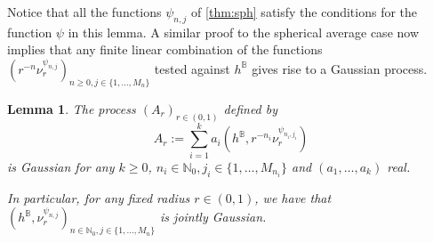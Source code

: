 \documentclass[JEP,XML,SOM,Unicode,published]{cedram}
\newtheorem{lemma}[theorem]{Lemma}
\theoremstyle{definition}
\newcommand{\N}{\mathbb{N}}
\newcommand{\B}{\mathbb{B}}\let\D\B\let\Ub\B
\begin{document}
Notice that all the functions $\psi_{n,j}$ of \cref{thm:sph} satisfy the conditions for the function $\psi$ in this lemma. A similar proof to the spherical average case now implies that any finite linear combination of the functions $(r^{-n}\nu^{\psi_{n,j}}_r)_{n \geq 0, j \in \{1, \dots, M_n\}}$ tested against $h^\B$ gives rise to a Gaussian process.

\begin{lemma}\label{lem:gp} The process $(A_r)_{r\in (0,1)}$ defined by\vspace*{-3pt}\enlargethispage{.2\baselineskip}%
\begin{equation}\label{eq:gp}
A_r := \sum_{i=1}^k a_i (h^\D,r^{-n_i}\nu^{\psi_{n_i,j_i}}_r)
\end{equation} is Gaussian for any $k\ge 0$, $n_i\in \N_0,j_i \in \{1, \dots, M_{n_i}\}$ and $(a_1,\dots, a_k)$ real.

In particular, for any fixed radius $r \in (0,1)$, we have that $(h^\B, \nu^{\psi_{n,j}}_r)_{n \in \N_0, j \in \{1, \dots, M_n\}}$ is jointly Gaussian.
\end{lemma}
\end{document}
